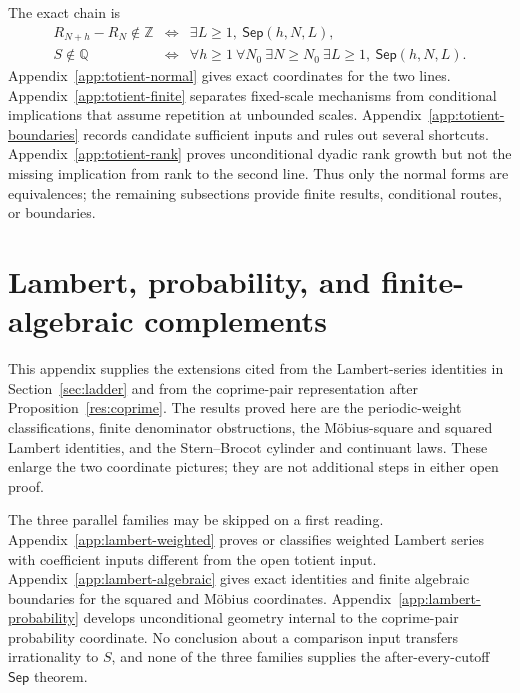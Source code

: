 \documentclass[11pt]{article}
\theoremstyle{definition}
\theoremstyle{remark}
\newcommand{\Z}{\mathbb{Z}}
\newcommand{\Q}{\mathbb{Q}}
\begin{document}
The exact chain is
\[
\begin{array}{rcl}
 R_{N+h}-R_N\notin\Z
 &\Longleftrightarrow&
 \exists L\geq1,\ \mathsf{Sep}(h,N,L),\\
 S\notin\Q
 &\Longleftrightarrow&
 \forall h\geq1\ \forall N_0\ \exists N\geq N_0\ \exists L\geq1,\
 \mathsf{Sep}(h,N,L).
\end{array}
\]
Appendix~\ref{app:totient-normal} gives exact coordinates for the two lines.
Appendix~\ref{app:totient-finite} separates fixed-scale mechanisms from
conditional implications that assume repetition at unbounded scales.
Appendix~\ref{app:totient-boundaries} records candidate sufficient inputs and
rules out several shortcuts.  Appendix~\ref{app:totient-rank} proves
unconditional dyadic rank growth but not the missing implication from rank to
the second line.  Thus only the normal forms are equivalences; the remaining
subsections provide finite results, conditional routes, or boundaries.

\TotientTechnicalAppendix

\section{Lambert, probability, and finite-algebraic complements}
\label{app:lambert-complements}

This appendix supplies the extensions cited from the Lambert-series identities
in Section~\ref{sec:ladder} and from the coprime-pair representation after
Proposition~\ref{res:coprime}.  The results proved here are the periodic-weight
classifications, finite denominator obstructions, the M\"obius-square and squared
Lambert identities, and the Stern--Brocot cylinder and continuant laws.
These enlarge the two coordinate pictures; they are not additional steps in
either open proof.

The three parallel families may be skipped on a first reading.
Appendix~\ref{app:lambert-weighted} proves or classifies weighted Lambert
series with coefficient inputs different from the open totient input.
Appendix~\ref{app:lambert-algebraic} gives exact identities and finite
algebraic boundaries for the squared and M\"obius coordinates.
Appendix~\ref{app:lambert-probability} develops unconditional geometry
internal to the coprime-pair probability coordinate.
No conclusion about a comparison input transfers irrationality to \(S\), and
none of the three families supplies the after-every-cutoff
\(\mathsf{Sep}\) theorem.

\FurtherLambertAppendix
\end{document}
